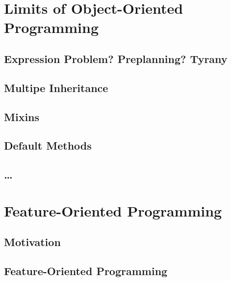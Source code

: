 \documentclass[
	aspectratio=169, %
	8pt, %
	handout, %
]{beamer}
\subtitle{7. Language-Based Techniques}
\author{Thomas Thüm}
\begin{document}


\section{Limits of Object-Oriented Programming}

\subsection{Expression Problem? Preplanning? Tyrany}
\subsection{Multipe Inheritance}
\subsection{Mixins}
\subsection{Default Methods}
\subsection{\ldots}

%

\lessonslearned{
	\item \ldots
}{
	\item \ldots
}{
	\ldots
}

\sectionend

\section{Feature-Oriented Programming}

\subsection{Motivation}
\subsection{Feature-Oriented Programming}
\end{document}
